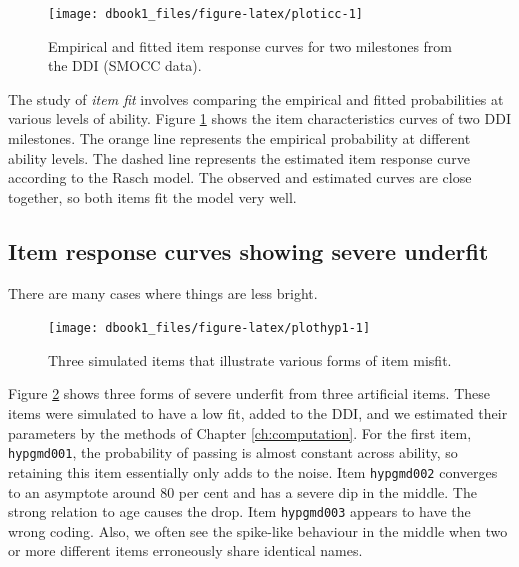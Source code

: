 \documentclass[
]{book}
\begin{document}
\begin{figure}

{\centering \texttt{[image: dbook1\_files/figure-latex/ploticc-1]} 

}

\caption{Empirical and fitted item response curves for two milestones from the DDI (SMOCC data).}\label{fig:ploticc}
\end{figure}



The study of \emph{item fit} involves comparing the empirical and fitted probabilities at various levels of ability. Figure \ref{fig:ploticc} shows the item characteristics curves of two DDI milestones. The orange line represents the empirical probability at different ability levels. The dashed line represents the estimated item response curve according to the Rasch model. The observed and estimated curves are close together, so both items fit the model very well.

\hypertarget{item-response-curves-showing-severe-underfit}{%
\subsection{Item response curves showing severe underfit}\label{item-response-curves-showing-severe-underfit}}

There are many cases where things are less bright.

\begin{figure}

{\centering \texttt{[image: dbook1\_files/figure-latex/plothyp1-1]} 

}

\caption{Three simulated items that illustrate various forms of item misfit.}\label{fig:plothyp1}
\end{figure}



Figure \ref{fig:plothyp1} shows three forms of severe underfit from three artificial items. These items were simulated to have a low fit, added to the DDI, and we estimated their parameters by the methods of Chapter \ref{ch:computation}. For the first item, \texttt{hypgmd001}, the probability of passing is almost constant across ability, so retaining this item essentially only adds to the noise. Item \texttt{hypgmd002} converges to an asymptote around 80 per cent and has a severe dip in the middle. The strong relation to age causes the drop. Item \texttt{hypgmd003} appears to have the wrong coding. Also, we often see the spike-like behaviour in the middle when two or more different items erroneously share identical names.
\end{document}
